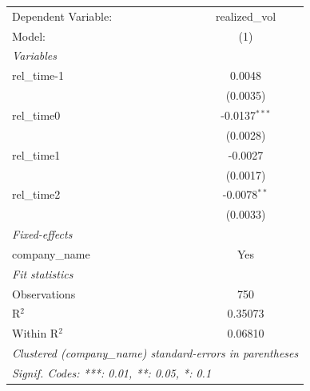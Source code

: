 
\begingroup
\centering
\begin{tabular}{lc}
   \tabularnewline \midrule \midrule
   Dependent Variable: & realized\_vol\\   
   Model:              & (1)\\  
   \midrule
   \emph{Variables}\\
   rel\_time-1         & 0.0048\\   
                       & (0.0035)\\   
   rel\_time0          & -0.0137$^{***}$\\   
                       & (0.0028)\\   
   rel\_time1          & -0.0027\\   
                       & (0.0017)\\   
   rel\_time2          & -0.0078$^{**}$\\   
                       & (0.0033)\\   
   \midrule
   \emph{Fixed-effects}\\
   company\_name       & Yes\\  
   \midrule
   \emph{Fit statistics}\\
   Observations        & 750\\  
   R$^2$               & 0.35073\\  
   Within R$^2$        & 0.06810\\  
   \midrule \midrule
   \multicolumn{2}{l}{\emph{Clustered (company\_name) standard-errors in parentheses}}\\
   \multicolumn{2}{l}{\emph{Signif. Codes: ***: 0.01, **: 0.05, *: 0.1}}\\
\end{tabular}
\par\endgroup


